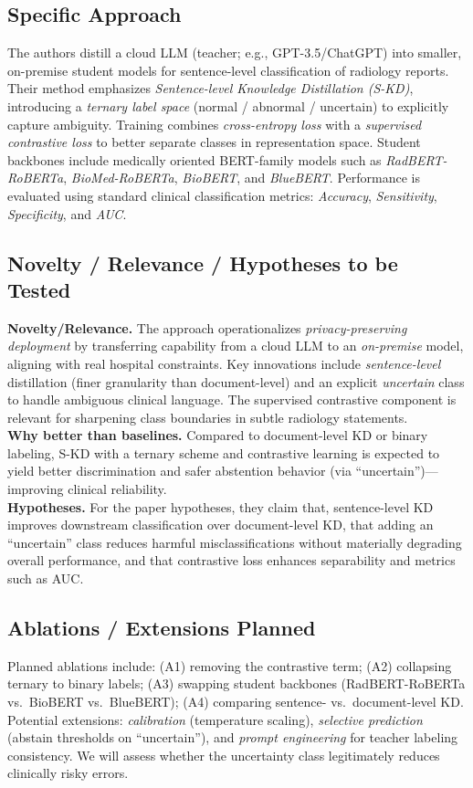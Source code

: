 \documentclass[letterpaper]{article} %
\begin{document}
\subsection{Specific Approach}
The authors distill a cloud LLM (teacher; e.g., GPT-3.5/ChatGPT) into smaller, on-premise student models for sentence-level classification of radiology reports. Their method emphasizes \emph{Sentence-level Knowledge Distillation (S-KD)}, introducing a \emph{ternary label space} (normal / abnormal / uncertain) to explicitly capture ambiguity. Training combines \emph{cross-entropy loss} with a \emph{supervised contrastive loss} to better separate classes in representation space. Student backbones include medically oriented BERT-family models such as \emph{RadBERT-RoBERTa}, \emph{BioMed-RoBERTa}, \emph{BioBERT}, and \emph{BlueBERT}. Performance is evaluated using standard clinical classification metrics: \emph{Accuracy}, \emph{Sensitivity}, \emph{Specificity}, and \emph{AUC}.

\subsection{Novelty / Relevance / Hypotheses to be Tested}
\textbf{Novelty/Relevance.} The approach operationalizes \emph{privacy-preserving deployment} by transferring capability from a cloud LLM to an \emph{on-premise} model, aligning with real hospital constraints. Key innovations include \emph{sentence-level} distillation (finer granularity than document-level) and an explicit \emph{uncertain} class to handle ambiguous clinical language. The supervised contrastive component is relevant for sharpening class boundaries in subtle radiology statements. \\
\textbf{Why better than baselines.} Compared to document-level KD or binary labeling, S-KD with a ternary scheme and contrastive learning is expected to yield better discrimination and safer abstention behavior (via ``uncertain'')—improving clinical reliability. \\
\textbf{Hypotheses.} For the paper hypotheses, they claim that, sentence-level KD improves downstream classification over document-level KD, that adding an ``uncertain'' class reduces harmful misclassifications without materially degrading overall performance, and that contrastive loss enhances separability and metrics such as AUC.

\subsection{Ablations / Extensions Planned}
Planned ablations include: (A1) removing the contrastive term; (A2) collapsing ternary to binary labels; (A3) swapping student backbones (RadBERT-RoBERTa vs.\ BioBERT vs.\ BlueBERT); (A4) comparing sentence- vs.\ document-level KD. Potential extensions: \emph{calibration} (temperature scaling), \emph{selective prediction} (abstain thresholds on ``uncertain''), and \emph{prompt engineering} for teacher labeling consistency. We will assess whether the uncertainty class legitimately reduces clinically risky errors.
\end{document}
